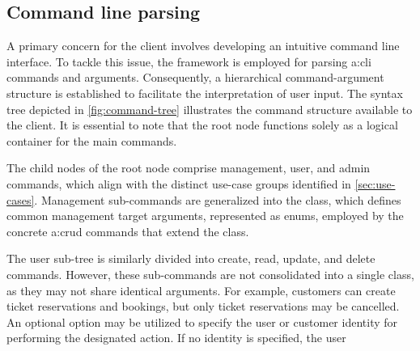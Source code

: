 \subsection{Command line parsing}\label{sec:cs-cli}


A primary concern for the client involves developing an intuitive command line interface. To tackle this issue, the  framework is employed for parsing \gls{a:cli} commands and arguments. Consequently, a hierarchical command-argument structure is established to facilitate the interpretation of user input. The syntax tree depicted in \cref{fig:command-tree} illustrates the command structure available to the client. It is essential to note that the root node functions solely as a logical container for the main commands.
\begin{minipage}[t]{0.45\textwidth}
The child nodes of the root node comprise management, user, and admin commands, which align with the distinct use-case groups identified in \cref{sec:use-cases}. Management sub-commands are generalized into the  class, which defines common management target arguments, represented as enums, employed by the concrete \gls{a:crud} commands that extend the  class.

The user sub-tree is similarly divided into create, read, update, and delete commands. However, these sub-commands are not consolidated into a single class, as they may not share identical arguments. For example, customers can create ticket reservations and bookings, but only ticket reservations may be cancelled. An optional  option may be utilized to specify the user or customer identity for performing the designated action. If no identity is specified, the user%
\end{minipage}
\hfill
